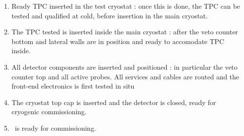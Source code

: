 \begin{enumerate}
\item Ready TPC inserted in the test cryostat : once this is done, the TPC can be tested and qualified at cold, before insertion in the main cryostat.
  
\item The TPC tested is inserted inside the main cryostat : after the veto counter bottom and lateral walls are in position and ready to accomodate TPC inside.

\item All detector components are inserted and positioned : in particular the veto counter top and all active probes. All services and cables are routed and the front-end electronics is first tested in situ

\item The cryostat top cap is inserted and the detector is closed, ready for
cryogenic commissioning.

\item \DSks\ is ready for commissioning.
	
\end{enumerate}

